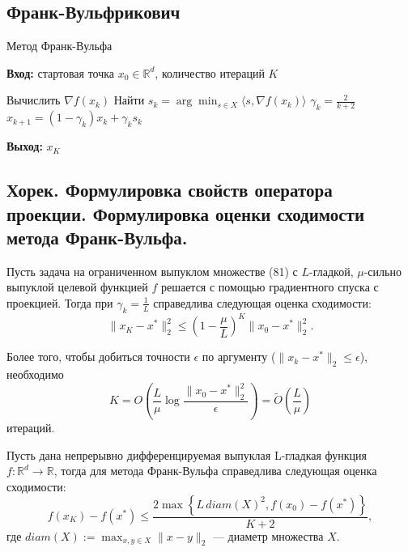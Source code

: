 \subsection*{Франк-Вульфрикович}

\begin{algorithm}[H]
    \caption{Метод Франк-Вульфа}
    \textbf{Вход:} стартовая точка $x_0 \in \mathbb{R}^d$, количество итераций $K$
    \begin{algorithmic}[1]
        \State Вычислить $\nabla f(x_k)$
        \State Найти $s_k = \arg \min_{s \in X} \langle s, \nabla f(x_k) \rangle$
        \State $\gamma_k = \frac{2}{k+2}$
        \State $x_{k+1} = (1 - \gamma_k)x_k + \gamma_k s_k$
        \EndFor
    \end{algorithmic}
    \textbf{Выход:} $x_K$
\end{algorithm}


\subsection{Хорек. Формулировка свойств оператора
    проекции. Формулировка оценки сходимости метода Франк-Вульфа.}

\begin{theorem}
    Пусть задача на ограниченном выпуклом множестве (81) с $L$-гладкой, $\mu$-сильно выпуклой целевой функцией $f$ решается с помощью градиентного спуска с проекцией. Тогда при $\gamma_k = \frac{1}{L}$ справедлива следующая оценка сходимости:
    $$\|x_K - x^*\|_2^2 \leq \left( 1 - \frac{\mu}{L} \right)^K \|x_0 - x^*\|_2^2.$$

    Более того, чтобы добиться точности $\epsilon$ по аргументу ($\|x_k - x^*\|_2 \leq \epsilon$), необходимо
    $$K = O \left( \frac{L}{\mu} \log \frac{\|x_0 - x^*\|_2^2}{\epsilon} \right) = \tilde{O} \left( \frac{L}{\mu} \right)$$
    итераций.
\end{theorem}

\begin{theorem}
    Пусть дана непрерывно дифференцируемая выпуклая L-гладкая функция $f : \mathbb{R}^d \to \mathbb{R}$, тогда для метода Франк-Вульфа справедлива следующая оценка сходимости:
    $$f(x_K) - f(x^*) \leq \frac{2 \max\left\{ L \, diam(X)^2, f(x_0) - f(x^*) \right\}}{K + 2},$$
    где $diam(X) := \max_{x, y \in X} \|x - y\|_2$ –-- диаметр множества $X$.
\end{theorem}
